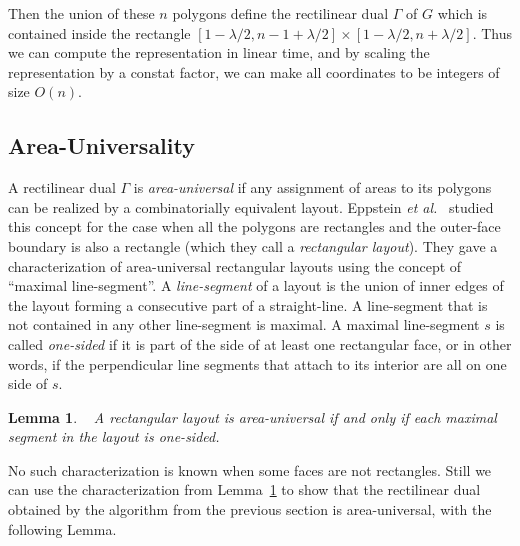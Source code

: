 \documentclass[11pt]{article}
\newtheorem{lemma}{Lemma}[section]
\begin{document}
Then the union of these $n$ polygons define the rectilinear dual $\Gamma$ of $G$ which is contained inside the rectangle
 $[1-\lambda/2, n-1+\lambda/2]\times[1-\lambda/2, n+\lambda/2]$. Thus we can compute the representation in linear time,
 and by scaling the representation by a constat factor, we can make all coordinates to be integers of size $O(n)$.


\subsection{Area-Universality}
\label{sec:universal}

A rectilinear dual $\Gamma$ is \textit{area-universal} if any assignment of areas to its polygons can be realized by a
 combinatorially equivalent layout. Eppstein \textit{et al.}~\cite{EMVS} studied
this concept
 for the case when all the polygons are rectangles and the outer-face
 boundary is also a rectangle (which they call a {\em rectangular layout}). They gave a characterization of area-universal rectangular layouts using the concept of
 ``maximal line-segment''.  A \textit{line-segment} of a layout is the union of inner edges of the layout forming a
 consecutive part of a straight-line. A line-segment that is not contained in any other line-segment is maximal. A
 maximal line-segment $s$ is called {\em one-sided} if it is part of the side of at least one rectangular face, or
 in other words, if the perpendicular line segments that attach to its interior are all on one side of $s$.

\begin{lemma}~\cite{EMVS}
\label{lem:area-uni} A rectangular layout
is area-universal if and only if each maximal segment in the layout is one-sided.
\end{lemma}


No such characterization is known when some faces are not rectangles.
Still we can use the characterization from
Lemma~\ref{lem:area-uni} to show that the rectilinear dual obtained by the algorithm from
the previous section is area-universal, with the following Lemma.
\end{document}
